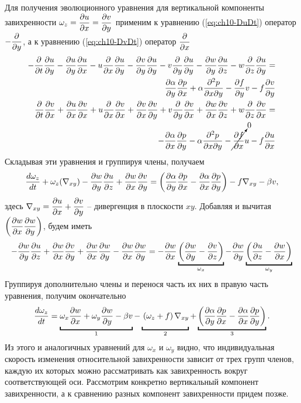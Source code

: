 Для получения эволюционного уравнения для вертикальной компоненты завихренности $\omega_z = \pd{u}{x}=\pd{v}{y}$ применим к уравнению (\ref{eq:ch10-DuDt}) оператор $-\pd{}{y}$, а к уравнению (\ref{eq:ch10-DvDt}) оператор $\pd{}{x}$ 
\begin{align*}
    -\pd{}{t}\pd{u}{y}-
        \pd{u}{y}\pd{u}{x} - u\pd{}{x}\pd{u}{y} -
        \pd{v}{y}\pd{u}{y} - v\pd{}{y}\pd{u}{y} -
        \pd{w}{y}\pd{u}{z} - w\pd{}{z}\pd{u}{y} = \\
    \pd{\alpha}{y}\pd{p}{x} + 
    \alpha\frac{\partial^2p}{\partial x \partial y} - \pd{f}{y}v - f\pd{v}{y} \\
    \pd{}{t}\pd{v}{x}+
        \pd{u}{x}\pd{v}{x} + u\pd{}{x}\pd{v}{x} +
        \pd{v}{x}\pd{v}{y} + v\pd{}{y}\pd{v}{x} +
        \pd{w}{x}\pd{v}{z} + w\pd{}{z}\pd{v}{x} = \\
    -\pd{\alpha}{x}\pd{p}{y} - 
        \alpha\frac{\partial^2p}{\partial x \partial y} - 
        \cancelto{0}{\pd{f}{x}}u - f\pd{u}{x} 
\end{align*}
Складывая эти уравнения и группируя члены, получаем
\begin{equation*}
    \td{\omega_z}{t}+\omega_z(\nabla_{xy})-\pd{w}{y}\pd{u}{z}+\pd{w}{x}\pd{v}{y} = \left( \pd{\alpha}{y}\pd{p}{x} - \pd{\alpha}{x}\pd{p}{y} \right) - f\nabla_{xy} - \beta v,
\end{equation*}
здесь $\nabla_{xy}=\pd{u}{x}+\pd{v}{y}$ -- дивергенция в плоскости $xy$. Добавляя и вычитая $\left( \pd{w}{x}\pd{w}{y} \right)$, будем иметь
\begin{equation*}
    -\pd{w}{y}\pd{u}{z}+\pd{w}{x}\pd{v}{y}+\pd{w}{x}\pd{w}{y}-\pd{w}{x}\pd{w}{y} = 
    -\pd{w}{x} \ub{ \left( \pd{w}{y} - \pd{v}{z} \right) }_{\omega_x} 
    -\pd{w}{y} \ub{ \left( \pd{u}{z} - \pd{w}{x} \right) }_{\omega_y} 
\end{equation*}
Группируя дополнительно члены и перенося часть их них в правую часть уравнения, получим окончательно
\begin{equation}
\label{eq:ch10_omegaz}
    \td{\omega_z}{t}=
    \ub{\vphantom{\left( \pd{\alpha}{z}\pd{p}{y} \right)}\omega_x\pd{w}{x} + \omega_y\pd{w}{y} -\beta v }_{1} - 
    \ub{\vphantom{\left( \pd{\alpha}{z}\pd{p}{y} \right)}
    \left( \omega_z + f \right) \nabla_{xy}}_{2}+
    \ub{\left( \pd{\alpha}{y}\pd{p}{x} - \pd{\alpha}{x}\pd{p}{y} \right)}_{3}.
\end{equation}
Из этого и аналогичных уравнений для $\omega_x$ и $\omega_y$ видно, что индивидуальная скорость изменения относительной завихренности зависит от трех групп членов, каждую их которых можно рассматривать как завихренность вокруг соответствующей оси. Рассмотрим конкретно вертикальный компонент завихренности, а к сравнению разных компонент завихренности придем позже. 

